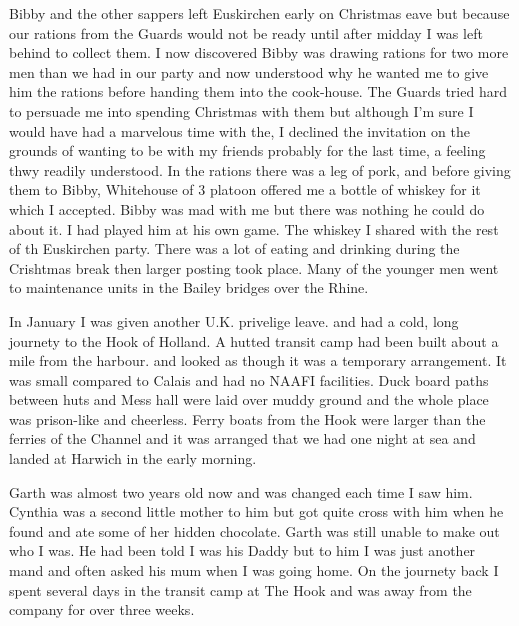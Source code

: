 \Sergeant Bibby and the other sappers left Euskirchen early on
Christmas eave but because our rations from the Guards would not be
ready until after midday I was left behind to collect them. I now
discovered Bibby was drawing rations for two more men than we had in
our party and now understood why he wanted me to give him the rations
before handing them into the cook-house. The Guards tried hard to
persuade me into spending Christmas with them but although I'm sure I
would have had a marvelous time with the, I declined the invitation on
the grounds of wanting to be with my friends probably for the last
time, a feeling thwy readily understood. In the rations there was a
leg of pork, and before giving them to Bibby, \sergeant Whitehouse of 3
platoon offered me a bottle of whiskey for it which I accepted. Bibby
was mad with me but there was nothing he could do about it. I had
played him at his own game. The whiskey I shared with the rest of th
Euskirchen party. There was a lot of eating and drinking during the
Crishtmas break then larger posting took place. Many of the younger
men went to maintenance units in the Bailey bridges over the Rhine.

In January I was given another U.K. privelige leave. and had a cold,
long journety to the Hook of Holland. A hutted transit camp had been
built about a mile from the harbour. and looked as though it was a
temporary arrangement. It was small compared to Calais and had no
NAAFI facilities. Duck board paths between huts and Mess hall were
laid over muddy ground and the whole place was prison-like and
cheerless. Ferry boats from the Hook were larger than the ferries of
the Channel and it was arranged that we had one night at sea and
landed at Harwich in the early morning.

Garth was almost two years old now and was changed each time I saw
him. Cynthia was a second little mother to him but got quite cross
with him when he found and ate some of her hidden chocolate. Garth was
still unable to make out who I was. He had been told I was his Daddy
but to him I was just another mand and often asked his mum when I was
going home. On the journety back I spent several days in the transit
camp at The Hook and was away from the company for over three weeks.

